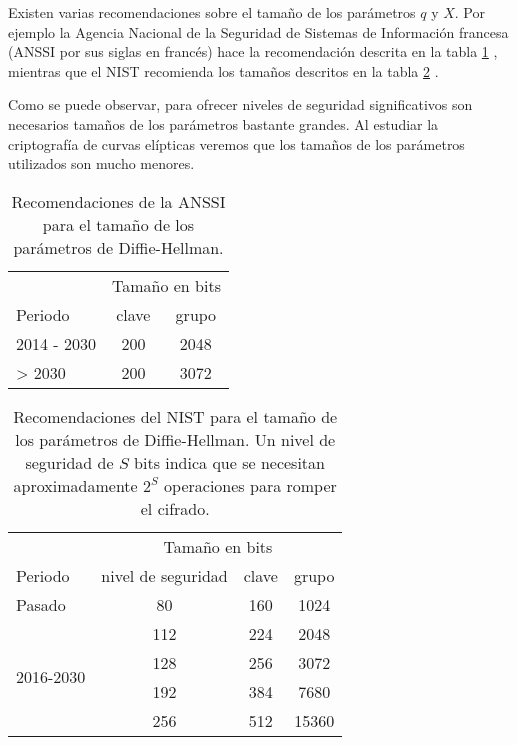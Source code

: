 \documentclass[
  a4paper,
  12pt,
  spanish,
]{scrartcl}
\begin{document}
Existen varias recomendaciones sobre el tamaño de los parámetros \(q\) y \(X\). Por ejemplo la Agencia Nacional de la Seguridad de Sistemas de Información francesa (ANSSI por sus siglas en francés) hace la recomendación descrita en la tabla \ref{tab:tam-anssi} \parencite{anssi_mecanismes_2014}, mientras que el NIST recomienda los tamaños descritos en la tabla \ref{tab:tam-nist} \parencite{barker_recommendation_2016}.

Como se puede observar, para ofrecer niveles de seguridad significativos son necesarios tamaños de los parámetros bastante grandes. Al estudiar la criptografía de curvas elípticas veremos que los tamaños de los parámetros utilizados son mucho menores. 

\begin{table}[h]
  \centering
  \sffamily
  \begin{tabular}{lcc}
    \toprule
    & \multicolumn{2}{c}{Tamaño en bits} \\
    Periodo & clave & grupo \\
    \midrule
    2014 - 2030 & 200 & 2048\\
    > 2030 & 200 & 3072\\
    \bottomrule
  \end{tabular}
  \caption{Recomendaciones de la ANSSI para el tamaño de los parámetros de Diffie-Hellman.}
  \label{tab:tam-anssi}
\end{table}

\begin{table}[h]
  \centering
  \sffamily
  \begin{tabular}{lccc}
    \toprule
     & \multicolumn{3}{c}{Tamaño en bits} \\
    Periodo & nivel de seguridad & clave & grupo \\
    \midrule
    Pasado & 80 & 160 & 1024\\
    \multirow[t]{4}{*}{2016-2030} & 112 & 224 & 2048\\
     & 128 & 256 & 3072\\
     & 192 & 384 & 7680\\
     & 256 & 512 & 15360\\
    \bottomrule
  \end{tabular}
  \caption{Recomendaciones del NIST para el tamaño de los parámetros de Diffie-Hellman. Un nivel de seguridad de \(S\) bits indica que se necesitan aproximadamente \(2^S\) operaciones para romper el cifrado.}
  \label{tab:tam-nist}
\end{table}
\end{document}
